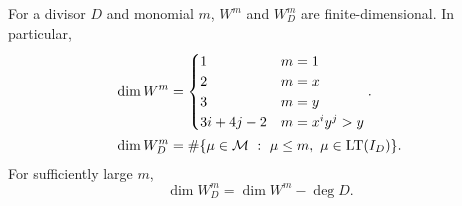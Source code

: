 \begin{theorem}
  \label{thm_dim_W}
  For a divisor $D$ and monomial $m$, $W^m$ and $W_D^m$ are finite-dimensional.
  In particular,
  \begin{align*}
    \dim W^m &= \begin{cases}
                  1 & m = 1 \\
                  2 & m = x \\
                  3 & m = y \\
                  3i + 4j - 2 & m = x^iy^j > y
                \end{cases}. \\
    \dim W_D^m &= \# \{ \mu \in \mathcal{M} ~:~ \mu \leq m, ~\mu \in \operatorname{LT}(I_D) \}.
  \end{align*}
  For sufficiently large $m$,
  \[ \dim W_D^m = \dim W^m - \deg D.\]
\end{theorem}
\begin{comment}
\begin{remark}
In theory, ``sufficiently large'' means $m \geq m'$,
where $m'$ is the maximum of the set $\{ \mu \in \cal M ~:~ \mu \not\in \LT(I_D) \}$,
as in the proof to follow.
In practice, when computing $D + D$', if $\deg(D + D') = d$,
we will choose $m$ to be the largest monomial found among all reduced Gr\"obner bases of divisors of degree $d$.
\end{remark}
\end{comment}
